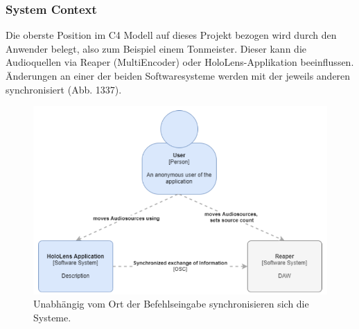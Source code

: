\documentclass[11pt, titlepage, fleqn]{report}
\begin{document}
                \subsubsection*{System Context}
                    Die oberste Position im C4 Modell auf dieses Projekt bezogen wird durch den Anwender belegt, also zum Beispiel einem 
                    Tonmeister. Dieser kann die Audioquellen via Reaper (MultiEncoder) oder HoloLens-Applikation beeinflussen. 
                    Änderungen an einer der beiden Softwaresysteme werden mit der jeweils anderen synchronisiert (Abb. 1337).
                    \begin{figure}[htbp]
                        \centering
                        \includegraphics[width=14cm]{./img/systemContext.png}
                        \caption{Unabhängig vom Ort der Befehlseingabe synchronisieren sich die Systeme.\label{fig:systemContext}}
                    \end{figure}
\end{document}
